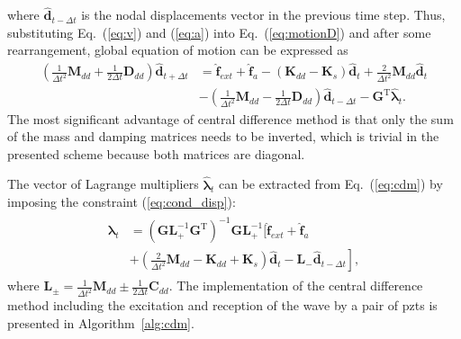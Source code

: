 \documentclass[11pt,a4paper,final]{report}
\theoremstyle{plain}
\begin{document}
where \(\widehat{\textbf{d}}_{t-\Delta t}\) is the nodal displacements vector in the previous time step.
Thus, substituting Eq.~(\ref{eq:v}) and (\ref{eq:a}) into Eq.~(\ref{eq:motionD}) and after some rearrangement, global equation of motion can be expressed as
\begin{equation}
	\begin{split}
		\left(\frac{1}{\Delta t^2}\textbf{M}_{dd}+\frac{1}{2\Delta t}\textbf{D}_{dd} \right)\widehat{\textbf{d}}_{t+\Delta t} & = \widehat{\textbf{f}}_{ext} + \widehat{\textbf{f}}_{a} - \left( \textbf{K}_{dd}-\textbf{K}_s\right)\widehat{\textbf{d}}_t
		+ \frac{2}{\Delta t^2}\textbf{M}_{dd}\widehat{\textbf{d}}_t\\
		&-\left(\frac{1}{\Delta t^2}\textbf{M}_{dd}-\frac{1}{2\Delta t}\textbf{D}_{dd}\right)\widehat{\textbf{d}}_{t-\Delta t}-\textbf{G}^{\mathrm{T}}\widehat{\boldsymbol{\lambda}}_t.
	\end{split}
	\label{eq:cdm}
\end{equation}
The most significant advantage of central difference method is that only the sum of the mass and damping matrices needs to be inverted, which is trivial in the presented scheme because both matrices are diagonal.

The vector of Lagrange multipliers \(\widehat{\boldsymbol{\lambda}}_t\) can be extracted from Eq.~(\ref{eq:cdm}) by imposing the constraint (\ref{eq:cond_disp}):
\begin{eqnarray}
	\begin{split}
		\widehat{\boldsymbol{\lambda}}_t & = {\left(\textbf{G}\textbf{L}_+^{-1}\textbf{G}^{\mathrm{T}} 	\right)}^{-1}\textbf{G}\textbf{L}_+^{-1} \Bigg[ \widehat{\textbf{f}}_{ext} + \widehat{\textbf{f}}_{a}\\
		& + \left.\left(\frac{2}{\Delta t^2}\textbf{M}_{dd}-\textbf{K}_{dd}+\textbf{K}_s\right)\widehat{\textbf{d}}_t -\textbf{L}_-\widehat{\textbf{d}}_{t-\Delta t} \right],
	\end{split}
	\label{eq:lambda}
\end{eqnarray}
where \(\textbf{L}_{\pm}=\frac{1}{\Delta t^2}\textbf{M}_{dd}\pm\frac{1}{2\Delta t}\textbf{C}_{dd}\).
The implementation of the central difference method including the excitation and reception of the wave by a pair of \acp{pzt} is presented in Algorithm~\ref{alg:cdm}.
\end{document}
